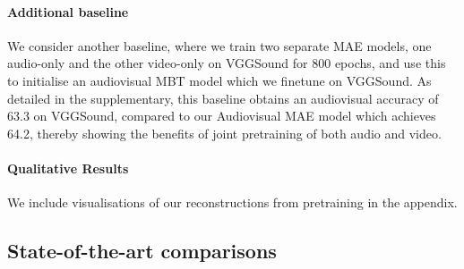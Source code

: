 \documentclass[10pt,twocolumn,letterpaper]{article}
\def \paravspace {-1\baselineskip}
\begin{document}
\vspace{\paravspace}
\paragraph{Additional baseline}

We consider another baseline, where we train two separate MAE models, one audio-only and the other video-only on VGGSound for 800 epochs, and use this to initialise an audiovisual MBT model which we finetune on VGGSound.
As detailed in the supplementary, this baseline obtains an audiovisual accuracy of 63.3 on VGGSound, compared to our Audiovisual MAE model which achieves 64.2, thereby showing the benefits of joint pretraining of both audio and video.

\vspace{\paravspace}
\paragraph{Qualitative Results} We include visualisations of our reconstructions from pretraining in the appendix.

\subsection{State-of-the-art comparisons}
\label{sec:exp_sota}
\vspace{-1mm}
\end{document}

